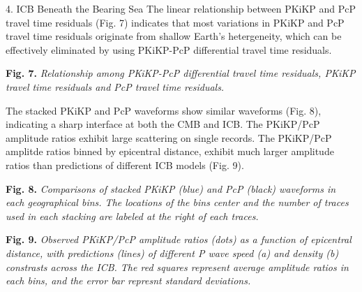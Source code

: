 \documentclass[
    landscape,      %
    paperwidth = 1200mm,
    paperheight = 900mm,
    fontscale = 0.34,
    margin = 1.7cm,
]{baposter}
\begin{document}
\begin{poster}
\begin{posterbox}[column=2 ]{4. ICB Beneath the Bearing Sea}
The linear relationship between PKiKP and PcP travel time residuals (Fig. 7)
indicates that most variations in PKiKP and PcP travel time residuals
originate from shallow Earth's hetergeneity, which can be effectively
eliminated by using PKiKP-PcP differential travel time residuals.
\begin{center}
\begin{tikzpicture}[nodes={inner sep=0}]
\end{tikzpicture}
\begin{minipage}{0.9\textwidth}
\footnotesize
\vspace{0.5em}
\textbf{Fig. 7.}
\itshape
Relationship among PKiKP-PcP differential travel time residuals, PKiKP
travel time residuals and PcP travel time residuals.
\end{minipage}
\end{center}

The stacked PKiKP and PcP waveforms show similar waveforms (Fig. 8), indicating a sharp
interface at both the CMB and ICB. The PKiKP/PcP amplitude ratios exhibit
large scattering on single records.
The PKiKP/PcP amplitde ratios binned by epicentral distance,
exhibit much larger amplitude ratios than predictions of different ICB models (Fig. 9).

\begin{center}
\begin{minipage}{0.32\textwidth}
\begin{minipage}{0.98\textwidth}
\footnotesize
\textbf{Fig. 8.}
\itshape
Comparisons of stacked PKiKP (blue) and PcP (black) waveforms in each
geographical bins. The locations of the bins center and the number of traces
used in each stacking are labeled at the right of each traces.
\end{minipage}
\end{minipage}
\hspace{0.4cm}
\begin{minipage}{0.52\textwidth}
\begin{minipage}{0.98\textwidth}
\footnotesize
\textbf{Fig. 9.}
\itshape
Observed PKiKP/PcP amplitude ratios (dots) as a function of epicentral distance,
with predictions (lines) of different P wave speed (a) and density (b) constrasts
across the ICB. The red squares represent average amplitude ratios in each bins, and
the error bar represnt standard deviations.
\end{minipage}
\end{minipage}
\end{center}
\end{posterbox}


\end{poster}
\end{document}
